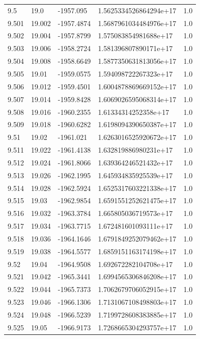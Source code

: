 \begin{tabular}{lllll}
9.5 & 19.0 & -1957.095 & 1.5625334526864294e+17 & 1.0 \\
9.501 & 19.002 & -1957.4874 & 1.5687961034484976e+17 & 1.0 \\
9.502 & 19.004 & -1957.8799 & 1.575083854981688e+17 & 1.0 \\
9.503 & 19.006 & -1958.2724 & 1.581396807890171e+17 & 1.0 \\
9.504 & 19.008 & -1958.6649 & 1.5877350631813056e+17 & 1.0 \\
9.505 & 19.01 & -1959.0575 & 1.594098722267323e+17 & 1.0 \\
9.506 & 19.012 & -1959.4501 & 1.6004878869669152e+17 & 1.0 \\
9.507 & 19.014 & -1959.8428 & 1.6069026595068314e+17 & 1.0 \\
9.508 & 19.016 & -1960.2355 & 1.61334314252358e+17 & 1.0 \\
9.509 & 19.018 & -1960.6282 & 1.6198094390650387e+17 & 1.0 \\
9.51 & 19.02 & -1961.021 & 1.6263016525920672e+17 & 1.0 \\
9.511 & 19.022 & -1961.4138 & 1.632819886980231e+17 & 1.0 \\
9.512 & 19.024 & -1961.8066 & 1.639364246521432e+17 & 1.0 \\
9.513 & 19.026 & -1962.1995 & 1.645934835925539e+17 & 1.0 \\
9.514 & 19.028 & -1962.5924 & 1.6525317603221338e+17 & 1.0 \\
9.515 & 19.03 & -1962.9854 & 1.6591551252621475e+17 & 1.0 \\
9.516 & 19.032 & -1963.3784 & 1.665805036719573e+17 & 1.0 \\
9.517 & 19.034 & -1963.7715 & 1.672481601093111e+17 & 1.0 \\
9.518 & 19.036 & -1964.1646 & 1.6791849252079462e+17 & 1.0 \\
9.519 & 19.038 & -1964.5577 & 1.6859151163174198e+17 & 1.0 \\
9.52 & 19.04 & -1964.9508 & 1.692672282104708e+17 & 1.0 \\
9.521 & 19.042 & -1965.3441 & 1.6994565306846208e+17 & 1.0 \\
9.522 & 19.044 & -1965.7373 & 1.7062679706052915e+17 & 1.0 \\
9.523 & 19.046 & -1966.1306 & 1.7131067108498803e+17 & 1.0 \\
9.524 & 19.048 & -1966.5239 & 1.7199728608383885e+17 & 1.0 \\
9.525 & 19.05 & -1966.9173 & 1.7268665304293757e+17 & 1.0 \\

\end{tabular}
